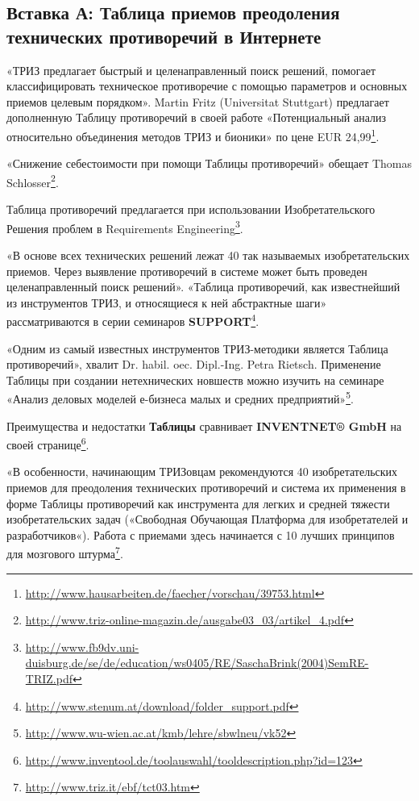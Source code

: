\documentclass[11pt,a4paper]{article}
\begin{document}
\subsection*{Вставка А: Таблица приемов преодоления технических противоречий в
  Интернете} 

«ТРИЗ предлагает быстрый и целенаправленный поиск решений, помогает
классифицировать техническое противоречие с помощью параметров и основных
приемов целевым порядком». Martin Fritz (Universitat Stuttgart) предлагает
дополненную Таблицу противоречий в своей работе «Потенциальный анализ
относительно объединения методов ТРИЗ и бионики» по цене EUR
24,99\footnote{\url{http://www.hausarbeiten.de/faecher/vorschau/39753.html}}.

«Снижение себестоимости при помощи Таблицы противоречий» обещает Thomas
Schlos\-ser\footnote{\url{http://www.triz-online-magazin.de/ausgabe03_03/artikel_4.pdf}}.

Таблица противоречий предлагается при использовании Изобретательского Решения
проблем в Requirements
Engineering\footnote{\url{http://www.fb9dv.uni-duisburg.de/se/de/education/ws0405/RE/SaschaBrink(2004)SemRE-TRIZ.pdf}}.

«В основе всех технических решений лежат 40 так называемых изобретательских
приемов. Через выявление противоречий в системе может быть проведен
целенаправленный поиск решений». «Таблица противоречий, как известнейший из
инструментов ТРИЗ, и относящиеся к ней абстрактные шаги» рассматриваются в
серии семинаров
\textbf{SUPPORT}\footnote{\url{http://www.stenum.at/download/folder_support.pdf}}.

«Одним из самый известных инструментов ТРИЗ-методики является Таблица
противоречий», хвалит Dr. habil. oec. Dipl.-Ing. Petra Rietsch. Применение
Таблицы при создании нетехнических новшеств можно изучить на семинаре «Анализ
деловых моделей е-бизнеса малых и средних
предприятий»\footnote{\url{http://www.wu-wien.ac.at/kmb/lehre/sbwlneu/vk52}}.

Преимущества и недостатки \textbf{Таблицы} сравнивает \textbf{INVENTNET® GmbH}
на своей
странице\footnote{\url{http://www.inventool.de/toolauswahl/tooldescription.php?id=123}}.

«В особенности, начинающим ТРИЗовцам рекомендуются 40 изобретательских приемов
для преодоления технических противоречий и система их применения в форме
Таблицы противоречий как инструмента для легких и средней тяжести
изобретательских задач («Свободная Обучающая Платформа для изобретателей и
разработчиков«). Работа с приемами здесь начинается с 10 лучших принципов для
мозгового штурма\footnote{\url{http://www.triz.it/ebf/tct03.htm}}.
\end{document}
